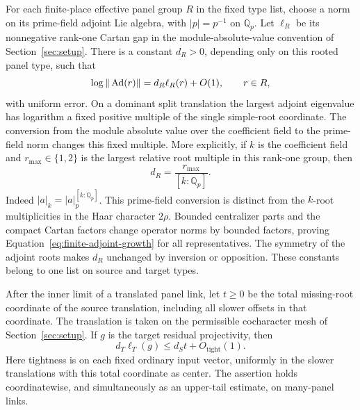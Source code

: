 For each finite-place effective panel group $R$ in the fixed type
list, choose a norm on its prime-field adjoint Lie algebra, with
$|p|=p^{-1}$ on $\mathbb Q_p$.  Let $\ell_R$ be its nonnegative
rank-one Cartan gap in the module-absolute-value convention of
Section~\ref{sec:setup}.  There is a constant $d_R>0$, depending
only on this rooted panel type, such that
\begin{equation}
 \log\|\operatorname{Ad}(r)\|=d_R\ell_R(r)+O(1),\qquad r\in R,
 \label{eq:finite-adjoint-growth}
\end{equation}
with uniform error.  On a dominant split translation the largest
adjoint eigenvalue has logarithm a fixed positive multiple of the
single simple-root coordinate.  The conversion from the module
absolute value over the coefficient field to the prime-field
norm changes this fixed multiple. More explicitly, if $k$ is the
coefficient field and $r_{\max}\in\{1,2\}$ is the largest relative
root multiple in this rank-one group, then
\[ d_R=\frac{r_{\max}}{[k:\mathbb Q_p]}. \]
Indeed $|a|_k=|a|_p^{[k:\mathbb Q_p]}$. This prime-field
conversion is distinct from the $k$-root multiplicities in the Haar
character $2\rho$. Bounded centralizer parts and
the compact Cartan factors change operator norms by bounded
factors, proving Equation~\eqref{eq:finite-adjoint-growth} for
all representatives.  The symmetry of the adjoint roots makes
$d_R$ unchanged by inversion or opposition.  These constants
belong to one list on source and target types.

\begin{proposition}
\label{prop:finite-speed}
After the inner limit of a translated panel link, let $t\geq0$
be the total missing-root coordinate of the source translation,
including all slower offsets in that coordinate.  The translation
is taken on the permissible cocharacter mesh of
Section~\ref{sec:setup}.  If $g$ is the target residual
projectivity, then
\begin{equation}
 d_T\ell_T(g)\leq d_St+O_{\mathrm{tight}}(1).
 \label{eq:finite-speed}
\end{equation}
Here tightness is on each fixed ordinary input vector, uniformly
in the slower translations with this total coordinate as center.
The assertion holds coordinatewise, and simultaneously as an
upper-tail estimate, on many-panel links.
\end{proposition}

